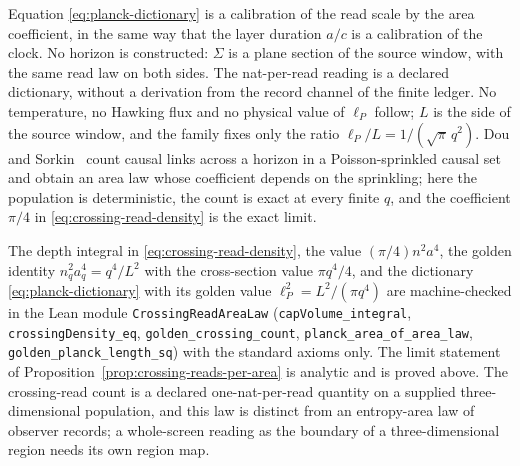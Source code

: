 \begin{remark}
\label{rem:crossing-not-claimed}
Equation \eqref{eq:planck-dictionary} is a calibration of the read scale by
the area coefficient, in the same way that the layer duration $a/c$ is a
calibration of the clock. No horizon is constructed: $\Sigma$ is a plane
section of the source window, with the same read law on both sides. The
nat-per-read reading is a declared dictionary, without a derivation from
the record channel of the finite ledger. No temperature, no Hawking flux
and no physical value of $\ell_P$ follow; $L$ is the side of the source
window, and the family fixes only the ratio $\ell_P/L=1/(\sqrt\pi\,q^2)$.
Dou and Sorkin~\cite{dousorkin2003} count causal links across a horizon in
a Poisson-sprinkled causal set and obtain an area law whose coefficient
depends on the sprinkling; here the population is deterministic, the count
is exact at every finite $q$, and the coefficient $\pi/4$ in
\eqref{eq:crossing-read-density} is the exact limit.
\end{remark}

The depth integral in \eqref{eq:crossing-read-density}, the value
$(\pi/4)n^2a^4$, the golden identity $n_q^2a_q^4=q^4/L^2$ with the
cross-section value $\pi q^4/4$, and the dictionary
\eqref{eq:planck-dictionary} with its golden value $\ell_P^2=L^2/(\pi q^4)$
are machine-checked in the Lean module \texttt{CrossingReadAreaLaw}
(\texttt{capVolume\_integral}, \texttt{crossingDensity\_eq},
\texttt{golden\_crossing\_count}, \texttt{planck\_area\_of\_area\_law},
\texttt{golden\_planck\_length\_sq}) with the standard axioms only. The
limit statement of Proposition~\ref{prop:crossing-reads-per-area} is
analytic and is proved above. The crossing-read count is a declared
one-nat-per-read quantity on a supplied three-dimensional population, and
this law is distinct from an entropy-area law of observer records; a
whole-screen reading as the boundary of a three-dimensional region needs its
own region map.

